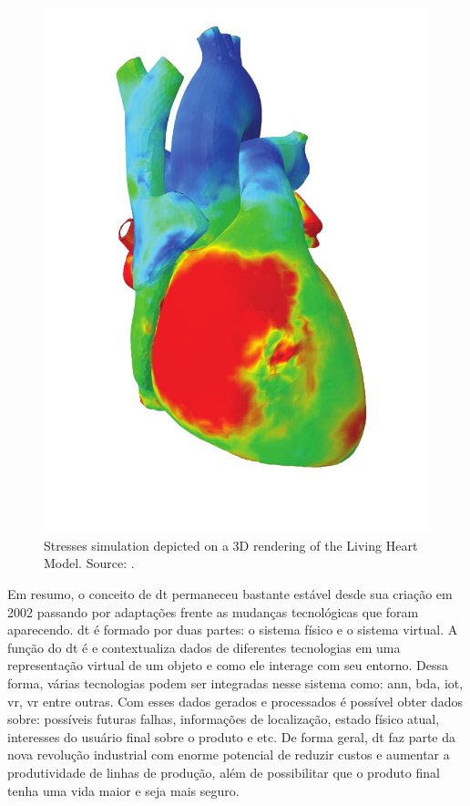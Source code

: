 \begin{figure}[h!]
    \centering
    \includegraphics[scale=0.75]{images/Related/heart.png}
    \caption{Stresses  simulation depicted on a 3D rendering of the Living Heart Model. Source: \cite{Levine2022}.}

    \label{fig:digitalTwinHeart}
\end{figure}


Em resumo, o conceito de \acrfull{dt} permaneceu bastante estável desde sua criação em 2002 passando por adaptações frente as mudanças tecnológicas que foram aparecendo. \acrshort{dt} é formado por duas partes: o sistema físico e o sistema virtual. A função do \acrshort{dt} é e contextualiza dados de diferentes tecnologias em uma representação virtual de um objeto e como ele interage com seu entorno. Dessa forma, várias tecnologias podem ser integradas nesse sistema como: \acrlong{ann}, \acrlong{bda}, \acrlong{iot}, \acrlong{vr}, \acrlong{vr} entre outras. Com esses dados gerados e processados é possível obter dados sobre: possíveis futuras falhas, informações de localização, estado físico atual, interesses do usuário final sobre o produto e etc. De forma geral, \acrshort{dt} faz parte da nova revolução industrial com enorme potencial de reduzir custos e aumentar a produtividade de linhas de produção, além de possibilitar que o produto final tenha uma vida maior e seja mais seguro. 



